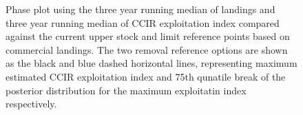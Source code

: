 \documentclass[11pt]{article}
\newcommand{\e}{/backup/bio_data/bio.lobster/figures/} %
\begin{document}
\begin{figure}
        \centering
                    \caption{Phase plot using the three year running median of landings and three year running median of CCIR exploitation index compared against the current upper stock and limit reference points based on commercial landings. The two removal reference options are shown as the black and blue dashed horizontal lines, representing maximum estimated CCIR exploitation index and 75th qunatile break of the posterior distribution for the maximum exploitatin index respectively.}
        
        \end{figure}
\end{document}

